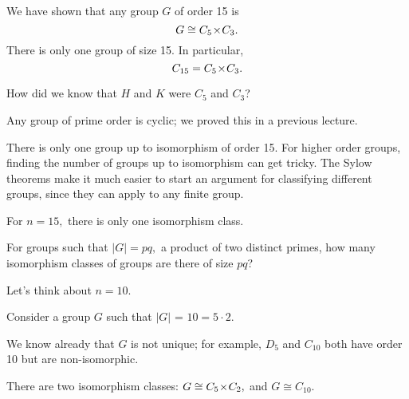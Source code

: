 We have shown that any group $G$ of order 15 is
\[
G \cong C_5 \hspace{0.05em}{\times}\hspace{0.05em} C_3.
\] There is only one group of size 15. In particular, \[C_{15} = C_5 \hspace{0.05em}{\times}\hspace{0.05em} C_3.\]

\begin{question}
How did we know that $H$ and $K$ were $C_5$ and $C_3$?

\end{question}
\begin{ans}
Any group of prime order is cyclic; we proved this in a previous lecture.
\end{ans}

There is only one group up to isomorphism of order 15. For higher order groups, finding the number of groups up to isomorphism can get tricky. The Sylow theorems make it much easier to start an argument for classifying different groups, since they can apply to any finite group. 

For $n = 15,$ there is only one isomorphism class. 

\begin{qq}
For groups such that $|G| = pq,$ a product of two distinct primes, how many isomorphism classes of groups are there of size $pq$?
\end{qq}

Let's think about $n = 10.$

\begin{example}
Consider a group $G$ such that $|G|$ = $10 = 5 \cdot 2.$

\end{example} 

We know already that $G$ is not unique; for example, $D_5$ and $C_{10}$ both have order 10 but are non-isomorphic.

\begin{proposition}
There are two isomorphism classes: $G \cong C_5 \hspace{0.05em}{\times}\hspace{0.05em} C_2,$ and $G \cong C_{10}.$
\end{proposition}

